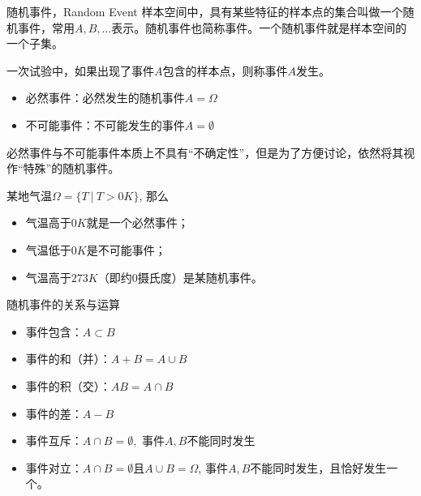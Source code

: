 \begin{frame}

\begin{block}{随机事件，Random Event}
样本空间中，具有某些特征的样本点的集合叫做一个随机事件，常用$A,B,\ldots$表示。随机事件也简称事件。一个随机事件就是样本空间的一个子集。

一次试验中，如果出现了事件$A$包含的样本点，则称事件$A$发生。

\vspace{1em}
\pause

\begin{itemize}
\item 必然事件：必然发生的随机事件$A = \Omega$
\item 不可能事件：不可能发生的事件$A = \emptyset$
\end{itemize}
必然事件与不可能事件本质上不具有``不确定性''，但是为了方便讨论，依然将其视作``特殊''的随机事件。

\vspace{1em}
\pause

某地气温$\Omega = \{T \ |\ T > 0K\}$, 那么
\begin{itemize}
\item 气温高于$0K$就是一个必然事件；
\item 气温低于$0K$是不可能事件；
\item 气温高于$273K$（即约0摄氏度）是某随机事件。
\end{itemize}
\end{block}

\end{frame}


\begin{frame}

\begin{block}{随机事件的关系与运算}
\begin{itemize}
\item 事件包含：$A\subset B$
\item 事件的和（并）：$A+B = A\cup B$
\item 事件的积（交）：$AB = A\cap B$
\item 事件的差：$A-B$
\item 事件互斥：$A\cap B = \emptyset,$ 事件$A,B$不能同时发生
\item 事件对立：$A\cap B = \emptyset$且$A\cup B = \Omega$, 事件$A,B$不能同时发生，且恰好发生一个。
\end{itemize}
\end{block}

\end{frame}

